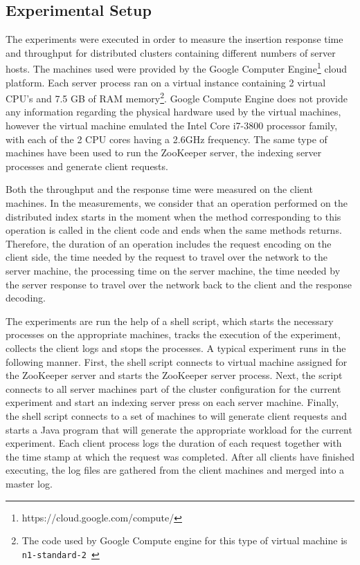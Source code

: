 \documentclass[11pt,a4paper]{globis-book}
\begin{document}
\subsection{Experimental Setup}
The experiments were executed in order to measure the insertion response time and throughput for distributed clusters containing different numbers of server hosts. The machines used were provided by the Google Computer Engine\footnote{https://cloud.google.com/compute/} cloud platform. Each server process ran on a virtual instance containing 2 virtual CPU's and 7.5 GB of RAM memory\footnote{The code used by Google Compute engine for this type of virtual machine is \texttt{n1-standard-2 }}. Google Compute Engine does not provide any information regarding the physical hardware used by the virtual machines, however the virtual machine emulated the Intel Core i7-3800 processor family, with each of the 2 CPU cores having a 2.6GHz frequency. The same type of machines have been used to run the ZooKeeper server, the indexing server processes and generate client requests. 

Both the throughput and the response time were measured on the client machines. In the measurements, we consider that an operation performed on the distributed index starts in the moment when the method corresponding to this operation is called in the client code and ends when the same methods returns. Therefore, the duration of an operation includes the request encoding on the client side, the time needed by the request to travel over the network to the server machine, the processing time on the server machine, the time needed by the server response to travel over the network back to the client and the response decoding. 

The experiments are run the help of a shell script, which starts the necessary processes on the appropriate machines, tracks the execution of the experiment, collects the client logs and stops the processes. A typical experiment runs in the following manner. First, the shell script connects to virtual machine assigned for the ZooKeeper server and starts the ZooKeeper server process. Next, the script connects to all server machines part of the cluster configuration for the current experiment and start an indexing server press on each server machine. Finally, the shell script connects to a set of machines to will generate client requests and starts a Java program that will generate the appropriate workload for the current experiment. Each client process logs the duration of each request together with the time stamp at which the request was completed. After all clients have finished executing, the log files are gathered from the client machines and merged into a master log. 
\end{document}
